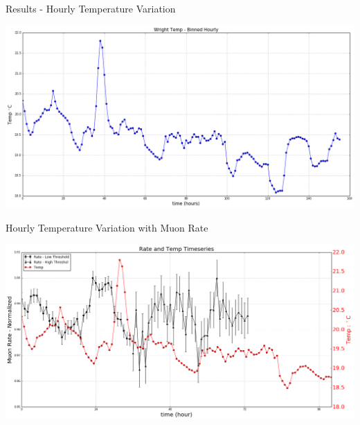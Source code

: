 \documentclass{beamer}
\begin{document}
\begin{frame}{Results - Hourly Temperature Variation}
\begin{center}
\includegraphics[scale=.25]{../Figures/tempVariation-Wide.png}
\end{center}
\end{frame}


\begin{frame}{Hourly Temperature Variation with Muon Rate}
\begin{center}
\includegraphics[scale=.27]{../Figures/bothTempVariation-Wide.png}
\end{center}
\end{frame}
\end{document}
